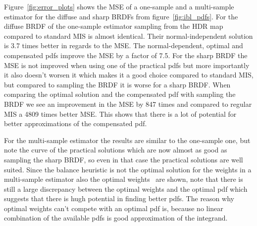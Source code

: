 Figure~\ref{fig:error_plots} shows the MSE of a one-sample and a multi-sample estimator for the diffuse and sharp BRDFs from figure~\ref{fig:ibl_pdfs}.
For the diffuse BRDF of the one-sample estimator sampling from the HDR map compared to standard MIS is almost identical.
Their normal-independent solution is 3.7 times better in regards to the MSE.
The normal-dependent, optimal and compensated pdfs improve the MSE by a factor of 7.5.
For the sharp BRDF the MSE is not improved when using one of the practical pdfs but more importantly it also doesn't worsen it which makes it a good choice compared to standard MIS,
but compared to sampling the BRDF it is worse for a sharp BRDF.
When comparing the optimal solution and the compensated pdf with sampling the BRDF we see an improvement in the MSE by 847 times and compared to regular MIS a 4809 times better MSE.
This shows that there is a lot of potential for better approximations of the compensated pdf.

For the multi-sample estimator the results are similar to the one-sample one,
but note the curve of the practical solutions which are now almost as good as sampling the sharp BRDF,
so even in that case the practical solutions are well suited.
Since the balance heuristic is not the optimal solution for the weights in a multi-sample estimator also the optimal weights~\cite{Kondapaneni2019} are shown,
note that there is still a large discrepancy between the optimal weights and the optimal pdf which suggests that there is hugh potential in finding better pdfs.
The reason why optimal weights can't compete with an optimal pdf is, because no linear combination of the available pdfs is good approximation of the integrand.

